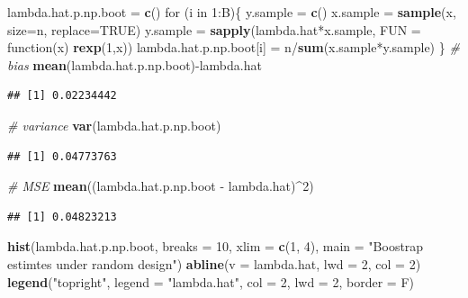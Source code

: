 \documentclass[]{article}
\newenvironment{Shaded}{\begin{snugshade}}{\end{snugshade}}
\newcommand{\KeywordTok}[1]{\textcolor[rgb]{0.13,0.29,0.53}{\textbf{{#1}}}}
\newcommand{\DataTypeTok}[1]{\textcolor[rgb]{0.13,0.29,0.53}{{#1}}}
\newcommand{\DecValTok}[1]{\textcolor[rgb]{0.00,0.00,0.81}{{#1}}}
\newcommand{\StringTok}[1]{\textcolor[rgb]{0.31,0.60,0.02}{{#1}}}
\newcommand{\CommentTok}[1]{\textcolor[rgb]{0.56,0.35,0.01}{\textit{{#1}}}}
\newcommand{\OtherTok}[1]{\textcolor[rgb]{0.56,0.35,0.01}{{#1}}}
\newcommand{\NormalTok}[1]{{#1}}
\begin{document}
\begin{Shaded}
\begin{Highlighting}[]
\NormalTok{lambda.hat.p.np.boot =}\StringTok{ }\KeywordTok{c}\NormalTok{()}
\NormalTok{for (i in }\DecValTok{1}\NormalTok{:B)\{}
    \NormalTok{y.sample =}\StringTok{ }\KeywordTok{c}\NormalTok{()}
    \NormalTok{x.sample =}\StringTok{ }\KeywordTok{sample}\NormalTok{(x, }\DataTypeTok{size=}\NormalTok{n, }\DataTypeTok{replace=}\OtherTok{TRUE}\NormalTok{)}
    \NormalTok{y.sample =}\StringTok{ }\KeywordTok{sapply}\NormalTok{(lambda.hat*x.sample, }\DataTypeTok{FUN =} \NormalTok{function(x) }\KeywordTok{rexp}\NormalTok{(}\DecValTok{1}\NormalTok{,x))}
    \NormalTok{lambda.hat.p.np.boot[i] =}\StringTok{ }\NormalTok{n/}\KeywordTok{sum}\NormalTok{(x.sample*y.sample)}
\NormalTok{\}}
\CommentTok{# bias}
\KeywordTok{mean}\NormalTok{(lambda.hat.p.np.boot)-lambda.hat}
\end{Highlighting}
\end{Shaded}

\begin{verbatim}
## [1] 0.02234442
\end{verbatim}

\begin{Shaded}
\begin{Highlighting}[]
\CommentTok{# variance}
\KeywordTok{var}\NormalTok{(lambda.hat.p.np.boot)}
\end{Highlighting}
\end{Shaded}

\begin{verbatim}
## [1] 0.04773763
\end{verbatim}

\begin{Shaded}
\begin{Highlighting}[]
\CommentTok{# MSE}
\KeywordTok{mean}\NormalTok{((lambda.hat.p.np.boot -}\StringTok{ }\NormalTok{lambda.hat)^}\DecValTok{2}\NormalTok{)}
\end{Highlighting}
\end{Shaded}

\begin{verbatim}
## [1] 0.04823213
\end{verbatim}

\begin{Shaded}
\begin{Highlighting}[]
\KeywordTok{hist}\NormalTok{(lambda.hat.p.np.boot, }\DataTypeTok{breaks =} \DecValTok{10}\NormalTok{, }\DataTypeTok{xlim =} \KeywordTok{c}\NormalTok{(}\DecValTok{1}\NormalTok{, }\DecValTok{4}\NormalTok{), }\DataTypeTok{main =} \StringTok{"Boostrap estimtes under random design"}\NormalTok{)}
\KeywordTok{abline}\NormalTok{(}\DataTypeTok{v =} \NormalTok{lambda.hat, }\DataTypeTok{lwd =} \DecValTok{2}\NormalTok{, }\DataTypeTok{col =} \DecValTok{2}\NormalTok{)}
\KeywordTok{legend}\NormalTok{(}\StringTok{"topright"}\NormalTok{, }\DataTypeTok{legend =} \StringTok{"lambda.hat"}\NormalTok{, }\DataTypeTok{col =} \DecValTok{2}\NormalTok{, }\DataTypeTok{lwd =} \DecValTok{2}\NormalTok{, }\DataTypeTok{border =} \NormalTok{F)}
\end{Highlighting}
\end{Shaded}
\end{document}
